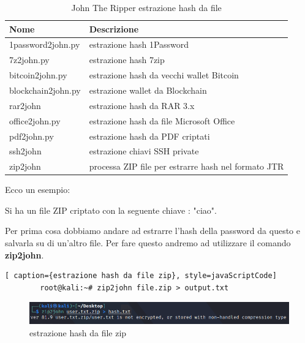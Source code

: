 \begin{table}[htbp]
    \begin{center}
    \begin{tabular}{|l|l|}
    \hline
    \textbf{Nome} & \textbf{Descrizione} \\
    \hline
    1password2john.py & estrazione hash 1Password \\
    \hline
    7z2john.py & estrazione hash 7zip \\
    \hline
    bitcoin2john.py & estrazione hash da vecchi wallet Bitcoin \\
    \hline
    blockchain2john.py & estrazione wallet da Blockchain \\
    \hline
    rar2john & estrazione hash da RAR 3.x \\
    \hline
    office2john.py & estrazione hash da file Microsoft Office \\
    \hline
    pdf2john.py & estrazione hash da PDF criptati \\
    \hline
    ssh2john & estrazione chiavi SSH private \\
    \hline
    zip2john & processa ZIP file per estrarre hash nel formato JTR \\
    \hline
    

    \end{tabular}
    \end{center}
    \caption{John The Ripper estrazione hash da file}
    \label{tab:browser}
    \end{table}

    Ecco un esempio:

    Si ha un file ZIP criptato con la seguente chiave : "ciao".

    Per prima cosa dobbiamo andare ad estrarre l'hash della password da questo e salvarla su di un'altro file. Per fare questo andremo ad utilizzare il comando \textbf{zip2john}.

    \begin{lstlisting}[ caption={estrazione hash da file zip}, style=javaScriptCode]
        root@kali:~# zip2john file.zip > output.txt
    \end{lstlisting}

    \begin{figure}[h!]
        \centering
        \includegraphics[width=\linewidth]{Immagini/3/hash_ex.png}
        \caption{estrazione hash da file zip}
    \end{figure}

